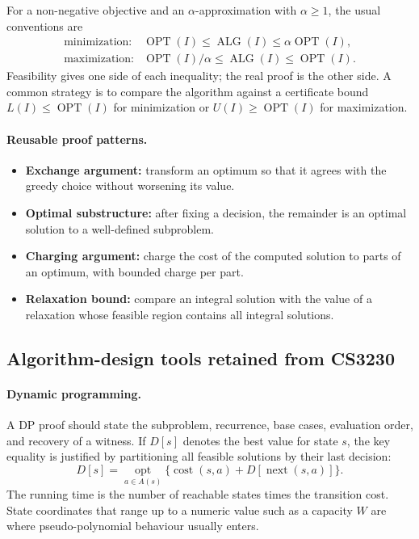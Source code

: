 \documentclass[10pt]{article}
\theoremstyle{definition}
\newcommand{\OPT}{\operatorname{OPT}}
\newcommand{\ALG}{\operatorname{ALG}}
\begin{document}
For a non-negative objective and an $\alpha$-approximation with $\alpha\ge1$,
the usual conventions are
\[
\begin{array}{ll}
\text{minimization:} & \OPT(I)\le\ALG(I)\le\alpha\OPT(I),\\[2pt]
\text{maximization:} & \OPT(I)/\alpha\le\ALG(I)\le\OPT(I).
\end{array}
\]
Feasibility gives one side of each inequality; the real proof is the other
side.  A common strategy is to compare the algorithm against a certificate
bound $L(I)\le\OPT(I)$ for minimization or $U(I)\ge\OPT(I)$ for maximization.

\paragraph{Reusable proof patterns.}
\begin{itemize}
  \item \textbf{Exchange argument:} transform an optimum so that it agrees
        with the greedy choice without worsening its value.
  \item \textbf{Optimal substructure:} after fixing a decision, the remainder
        is an optimal solution to a well-defined subproblem.
  \item \textbf{Charging argument:} charge the cost of the computed solution
        to parts of an optimum, with bounded charge per part.
  \item \textbf{Relaxation bound:} compare an integral solution with the value
        of a relaxation whose feasible region contains all integral solutions.
\end{itemize}

\subsection{Algorithm-design tools retained from CS3230}

\paragraph{Dynamic programming.}
A DP proof should state the subproblem, recurrence, base cases, evaluation
order, and recovery of a witness.  If $D[s]$ denotes the best value for state
$s$, the key equality is justified by partitioning all feasible solutions by
their last decision:
\[
  D[s]=\operatorname*{opt}_{a\in A(s)}
       \{\operatorname{cost}(s,a)+D[\operatorname{next}(s,a)]\}.
\]
The running time is the number of reachable states times the transition cost.
State coordinates that range up to a numeric value such as a capacity $W$ are
where pseudo-polynomial behaviour usually enters.
\end{document}
